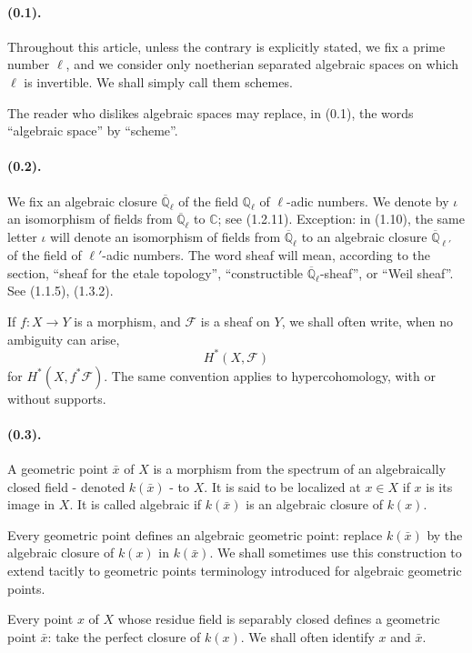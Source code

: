 \documentclass[11pt]{article}
\theoremstyle{remark}
\newcommand{\Ql}{\mathbb{Q}_\ell}
\newcommand{\Qlb}{\overline{\mathbb{Q}}_\ell}
\begin{document}
\paragraph{(0.1).} Throughout this article, unless the contrary is explicitly stated, we fix a prime number $\ell$, and we consider only noetherian separated algebraic spaces on which $\ell$ is invertible. We shall simply call them schemes.

The reader who dislikes algebraic spaces may replace, in (0.1), the words ``algebraic space'' by ``scheme''.

\paragraph{(0.2).} We fix an algebraic closure $\Qlb$ of the field $\Ql$ of $\ell$-adic numbers. We denote by $\iota$ an isomorphism of fields from $\Qlb$ to $\mathbb C$; see (1.2.11). Exception: in (1.10), the same letter $\iota$ will denote an isomorphism of fields from $\Qlb$ to an algebraic closure $\overline{\mathbb Q}_{\ell'}$ of the field of $\ell'$-adic numbers. The word sheaf will mean, according to the section, ``sheaf for the etale topology'', ``constructible $\Qlb$-sheaf'', or ``Weil sheaf''. See (1.1.5), (1.3.2).

If $f:X\to Y$ is a morphism, and $\mathcal F$ is a sheaf on $Y$, we shall often write, when no ambiguity can arise,
\[
H^*(X,\mathcal F)
\]
for $H^*(X,f^*\mathcal F)$. The same convention applies to hypercohomology, with or without supports.

\paragraph{(0.3).} A geometric point $\bar x$ of $X$ is a morphism from the spectrum of an algebraically closed field - denoted $k(\bar x)$ - to $X$. It is said to be localized at $x\in X$ if $x$ is its image in $X$. It is called algebraic if $k(\bar x)$ is an algebraic closure of $k(x)$.

Every geometric point defines an algebraic geometric point: replace $k(\bar x)$ by the algebraic closure of $k(x)$ in $k(\bar x)$. We shall sometimes use this construction to extend tacitly to geometric points terminology introduced for algebraic geometric points.

Every point $x$ of $X$ whose residue field is separably closed defines a geometric point $\bar x$: take the perfect closure of $k(x)$. We shall often identify $x$ and $\bar x$.
\end{document}
